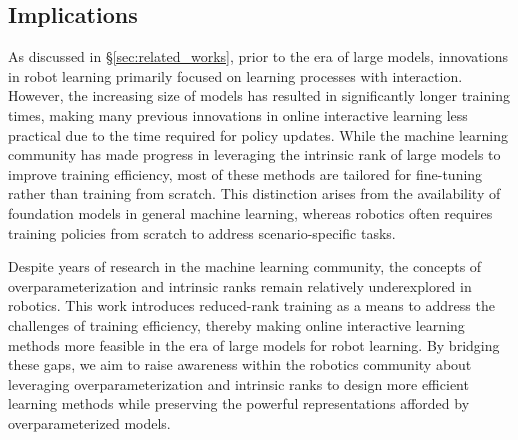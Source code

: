 \subsection{Implications}
As discussed in \S\ref{sec:related_works}, prior to the era of large models, innovations in robot learning primarily focused on learning processes with interaction. However, the increasing size of models has resulted in significantly longer training times, making many previous innovations in online interactive learning less practical due to the time required for policy updates. While the machine learning community has made progress in leveraging the intrinsic rank of large models to improve training efficiency, most of these methods are tailored for fine-tuning rather than training from scratch. This distinction arises from the availability of foundation models in general machine learning, whereas robotics often requires training policies from scratch to address scenario-specific tasks.

Despite years of research in the machine learning community, the concepts of overparameterization and intrinsic ranks remain relatively underexplored in robotics. This work introduces reduced-rank training as a means to address the challenges of training efficiency, thereby making online interactive learning methods more feasible in the era of large models for robot learning. By bridging these gaps, we aim to raise awareness within the robotics community about leveraging overparameterization and intrinsic ranks to design more efficient learning methods while preserving the powerful representations afforded by overparameterized models.

